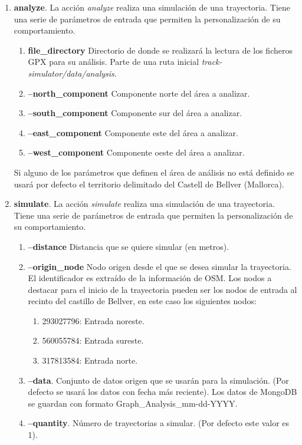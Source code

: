 \begin{enumerate}[label={A.\arabic*.}]
\item \textbf{analyze}. La acción \textit{analyze} realiza una simulación de una 
trayectoria. Tiene una serie de parámetros de entrada que permiten la personalización 
de su comportamiento.
\begin{enumerate}[label*={P.\arabic*.}]
\item \textbf{file\_directory} Directorio de donde se realizará la lectura de los ficheros 
\ac{GPX} para su análisis. Parte de una ruta inicial \textit{track-simulator/data/analysis}.
\item \textbf{--north\_component} Componente norte del área a analizar.
\item \textbf{--south\_component} Componente sur del área a analizar.
\item \textbf{--east\_component} Componente este del área a analizar.
\item \textbf{--west\_component} Componente oeste del área a analizar.
\end{enumerate}
Si alguno de los parámetros que definen el área de análisis no está definido se usará 
por defecto el territorio delimitado del Castell de Bellver (Mallorca).

\item \textbf{simulate}. La acción \textit{simulate} realiza una simulación de una 
trayectoria. Tiene una serie de parámetros de entrada que permiten la personalización 
de su comportamiento.

\begin{enumerate}[label*={P.\arabic*.}]
\item \textbf{--distance} Distancia que se quiere simular (en metros).

\item \textbf{--origin\_node} Nodo origen desde el que se desea simular la trayectoria.  
El identificador es extraído de la información de \ac{OSM}. Los nodos a destacar para el 
inicio de la trayectoria pueden ser los nodos de entrada al recinto del castillo de Bellver, 
en este caso los siguientes nodos:
\begin{enumerate}
\item 293027796: Entrada noreste.
\item 560055784: Entrada sureste.
\item 317813584: Entrada norte.
\end{enumerate}

\item \textbf{--data}. Conjunto de datos origen que se usarán para la simulación. (Por 
defecto se usará los datos con fecha más reciente). Los datos de MongoDB se guardan 
con formato Graph\_Analysis\_mm-dd-YYYY.

\item \textbf{--quantity}. Número de trayectorias a simular. (Por defecto este valor es 
1).
\end{enumerate}
\end{enumerate}

